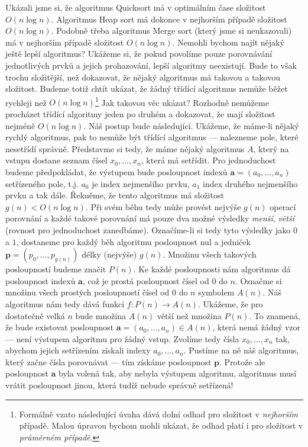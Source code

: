 Ukázali jsme si, že algoritmus Quicksort má v optimálním čase složitost $O(n\log n)$. Algoritmus Heap sort má dokonce v nejhorším případě složitost $O(n\log n)$.
Podobně třeba algoritmus Merge sort (který jsme si neukazovali) má v nejhorším případě složitost $O(n\log n)$. Nemohli bychom najít nějaký ještě lepší algoritmus?
Ukážeme si, že pokud povolíme pouze porovnávání jednotlivých prvků a jejich prohazování, lepší algoritmy neexistují. Bude to však trochu složitější, než dokazovat, že nějaký algoritmus má takovou a takovou
složitost. Budeme totiž chtít ukázat, že žádný třídící algoritmus nemůže běžet rychleji než $O(n\log n)$\footnote{Formálně vzato následující úvaha dává dolní odhad pro složitost v \emph{nejhorším} případě. Malou úpravou bychom mohli ukázat, že odhad platí i pro složitost v \emph{průměrném případě}.} Jak takovou věc ukázat? Rozhodně nemůžeme procházet
třídící algoritmy jeden po druhém a dokazovat, že mají složitost nejméně $O(n\log n)$. Náš postup bude následující. Ukážeme, že máme-li nějaký rychlý algoritmus,
pak to nemůže být třídící algoritmus --- nalezneme pole, které nesetřídí správně. Představme si tedy, že máme nějaký algoritmus $A$, který na vstupu dostane
seznam čísel $x_0,\ldots,x_n$, která má setřídit. Pro jednoduchost budeme předpokládat, že výstupem bude posloupnost indexů $\mathbf{a}=(a_0,\ldots,a_n)$ setřízeného pole, t.j.
$a_0$ je index nejmenšího prvku, $a_1$ index druhého nejmenšího prvku a tak dále. Řekněme, že tento algoritmus má složitost $g(n)<O(n\log n)$. Při svém běhu
tedy může provést nejvýše $g(n)$ operací porovnání a každé takové porovnání má pouze dva možné výsledky \emph{menší}, \emph{větší} (rovnost pro jednoduchost zanedbáme).
Označíme-li si tedy tyto výsledky jako $0$ a $1$, dostaneme pro každý běh algoritmu posloupnost nul a jedniček $\mathbf{p}=(p_0,\ldots,p_{g(n)})$ délky (nejvýše) $g(n)$.
Množinu všech takových posloupností budeme značit $P(n)$. Ke každé posloupnosti nám algoritmus dá posloupnost indexů $\mathbf{a}$, což je prostá posloupnost čísel od $0$ do $n$.
Označme si množinu všech prostých posloupností čísel od $0$ do $n$ symbolem $A(n)$. Náš algoritmus nám tedy dává funkci $f:P(n)\to A(n)$. 
Ukážeme, že pro dostatečně velká $n$ bude množina $A(n)$ větší než množina $P(n)$. To znamená, že bude existovat posloupnost $\mathbf{a}=(a_0, \ldots, a_n)\in A(n)$, 
která nemá žádný vzor --- není výstupem algoritmu pro žádný vstup. Zvolíme tedy čísla $x_0,\ldots, x_n$ tak,
abychom jejich setřízením získali indexy $a_0, \ldots, a_n$. Pustíme na ně náš algoritmus, který začne čísla porovnávat --- tím získáme posloupnost $\mathbf{p}$.
Protože ale posloupnost $\mathbf{a}$ byla volená tak, aby nebyla výstupem algoritmu, algoritmus musí vrátit posloupnost jinou, která tudíž nebude správně
setřízená! 

